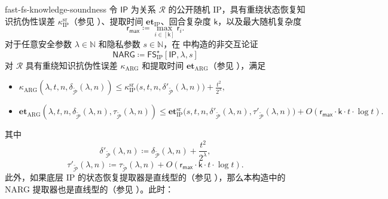 \documentclass[american,singlepageview]{snargs-book-zh}
\newcommand{\Malicious}[1]{\tilde{#1}}
\newcommand{\DefineEqual}{\coloneqq}
\newcommand{\Naturals}{\mathbb{N}}
\newcommand{\Relation}{\mathcal{R}}
\newcommand{\InstanceSize}{n}
\newcommand{\ProtoProver}{P}
\newcommand{\ProtoKnowledgeError}{\kappa}
\newcommand{\ProtoKnowledgeTime}{\mathbf{et}}
\newcommand{\ProtoRoundComplexity}{\mathsf{k}}
\newcommand{\ProtoRandomnessComplexity}{\mathsf{r}}
\newcommand{\RoundIndex}{i}
\newcommand{\SRSuperscript}{\mathrm{sr}}
\newcommand{\ProtoSRKnowledgeError}{\ProtoKnowledgeError^{\SRSuperscript}}
\newcommand{\IPSymbol}{\mathsf{IP}}
\newcommand{\IPSubscript}{\scriptscriptstyle\mathrm{IP}}
\newcommand{\IPKnowledgeTime}{\ProtoKnowledgeTime_{\IPSubscript}}
\newcommand{\IPRoundComplexity}{\ProtoRoundComplexity}
\newcommand{\IPRandomnessComplexity}{\ProtoRandomnessComplexity}
\newcommand{\IPMaxRandomnessComplexity}{\IPRandomnessComplexity_{{\scriptscriptstyle\mathsf{max}}}}
\newcommand{\NARGSymbol}{\mathsf{NARG}}
\newcommand{\ARGSubscript}{\scriptscriptstyle\mathrm{ARG}}
\newcommand{\ARGFormat}[1]{\mathcal{#1}}
\newcommand{\ARGProver}{\ARGFormat{\ProtoProver}}
\newcommand{\ARGKnowledgeTime}{\ProtoKnowledgeTime_{\ARGSubscript}}
\newcommand{\ARGKnowledgeError}{\ProtoKnowledgeError_{\ARGSubscript}}
\newcommand{\ProverFailureProbability}[1]{\delta_{#1}}
\newcommand{\ProverFailureProbabilityPrime}[1]{\delta'_{#1}}
\newcommand{\ProverRunningTime}[1]{\tau_{#1}}
\newcommand{\ProverRunningTimePrime}[1]{\tau'_{#1}}
\newcommand{\ROQueryBound}{t}
\newcommand{\SecurityParameter}{\lambda}
\newcommand{\PrivacyParameter}{s}
\newcommand{\FormatTransName}[1]{\bm{\mathsf{#1}}}
\newcommand{\FastFSonIPSymbol}{\FormatTransName{FS}_{\IPSubscript}^{\star}}
\newcommand{\FormatTransInputs}[3]{[#1,#2,#3]}
\newcommand{\FastFSonIPTransformation}[3]{\FastFSonIPSymbol\FormatTransInputs{#1}{#2}{#3}}
\newcommand{\FastTraceToSlowTraceTime}{O(\IPMaxRandomnessComplexity \cdot \IPRoundComplexity \cdot \ROQueryBound \cdot \log \ROQueryBound)}
\newcommand{\IPSRKnowledgeError}{\ProtoSRKnowledgeError_{\IPSubscript}}
\newcommand{\IPSRKnowledgeTime}{\ProtoKnowledgeTime_{\IPSubscript}^{\SRSuperscript}}
\newcommand{\FSErrorExpression}[1][\ROQueryBound]{\frac{#1^2}{2^{\SecurityParameter}}}
\begin{document}
\begin{ImportantTheorem}{}{fast-fs-knowledge-soundness}
令 $\IPSymbol$ 为关系 $\Relation$ 的公开随机 IP，具有重绕状态恢复知识抗伪性误差 $\IPSRKnowledgeError$（参见 ）、提取时间 $\IPKnowledgeTime$、回合复杂度 $\IPRoundComplexity$，以及最大随机复杂度
\[
\IPMaxRandomnessComplexity \DefineEqual \max_{\RoundIndex \in [\IPRoundComplexity]} \IPRandomnessComplexity_{\RoundIndex}.
\]
对于任意安全参数 $\SecurityParameter \in \Naturals$ 和隐私参数 $\PrivacyParameter \in \Naturals$，在  中构造的非交互论证
\[
\NARGSymbol \DefineEqual \FastFSonIPTransformation{\IPSymbol}{\SecurityParameter}{\PrivacyParameter}
\]
对 $\Relation$ 具有重绕知识抗伪性误差 $\ARGKnowledgeError$ 和提取时间 $\ARGKnowledgeTime$（参见 ），满足
\begin{itemize}[nolistsep]
  \item 
  $\displaystyle
  \ARGKnowledgeError(\SecurityParameter,\ROQueryBound,\InstanceSize,\ProverFailureProbability{\Malicious{\ARGProver}}(\SecurityParameter,\InstanceSize))
  \le
  \IPSRKnowledgeError\bigl(\PrivacyParameter,\ROQueryBound,\InstanceSize,\ProverFailureProbabilityPrime{\Malicious{\ARGProver}}(\SecurityParameter,\InstanceSize)\bigr)
  + \FSErrorExpression,
  $
  \item
  $\displaystyle
  \ARGKnowledgeTime(\SecurityParameter,\ROQueryBound,\InstanceSize,\ProverFailureProbability{\Malicious{\ARGProver}}(\SecurityParameter,\InstanceSize),\ProverRunningTime{\Malicious{\ARGProver}}(\SecurityParameter,\InstanceSize))
  \le
  \IPSRKnowledgeTime\bigl(\PrivacyParameter,\ROQueryBound,\InstanceSize,\ProverFailureProbabilityPrime{\Malicious{\ARGProver}}(\SecurityParameter,\InstanceSize),\ProverRunningTimePrime{\Malicious{\ARGProver}}(\SecurityParameter,\InstanceSize)\bigr)
  + \FastTraceToSlowTraceTime.
  $
\end{itemize}
其中
\[
\ProverFailureProbabilityPrime{\Malicious{\ARGProver}}(\SecurityParameter,\InstanceSize)
\DefineEqual
\ProverFailureProbability{\Malicious{\ARGProver}}(\SecurityParameter,\InstanceSize)
+ \FSErrorExpression,
\]
\[
\ProverRunningTimePrime{\Malicious{\ARGProver}}(\SecurityParameter,\InstanceSize)
\DefineEqual
\ProverRunningTime{\Malicious{\ARGProver}}(\SecurityParameter,\InstanceSize)
+ \FastTraceToSlowTraceTime.
\]
此外，如果底层 IP 的状态恢复提取器是直线型的（参见 ），那么本构造中的 NARG 提取器也是直线型的（参见 ）。此时：

\end{ImportantTheorem}
\end{document}
